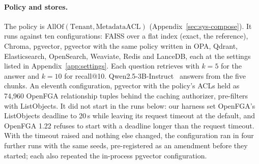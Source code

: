 \paragraph{Policy and stores.}
The policy is $\mathrm{AllOf}(\mathrm{Tenant}, \mathrm{MetadataACL})$ (Appendix~\ref{sec:sys-compose}).
It runs against ten configurations: FAISS over a flat index (exact, the reference), Chroma, pgvector,
pgvector with the same policy written in OPA, Qdrant, Elasticsearch, OpenSearch, Weaviate, Redis and
LanceDB, each at the settings listed in Appendix~\ref{app:settings}. Each question retrieves with
$k = 5$ for the answer and $k = 10$ for recall@10. Qwen2.5-3B-Instruct~\cite{yang2024qwen25} answers
from the five chunks. An eleventh configuration, pgvector with the policy's ACLs held as 74,960
OpenFGA relationship tuples behind the caching authorizer, pre-filters with ListObjects. It did not
start in the runs below: our harness set OpenFGA's ListObjects deadline to 20\,s while leaving its
request timeout at the default, and OpenFGA 1.22 refuses to start with a deadline longer than the
request timeout. With the timeout raised and nothing else changed, the configuration ran in four further
runs with the same seeds, pre-registered as an amendment before they started; each also repeated
the in-process pgvector configuration.

